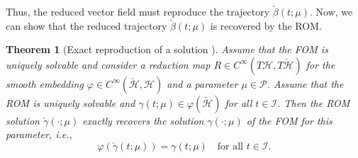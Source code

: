 \documentclass{article}
\theoremstyle{plain}
\newtheorem{theorem}{Theorem}[section]
\theoremstyle{definition}
\theoremstyle{remark}
\begin{document}
Thus, the reduced vector field must reproduce the trajectory \(\check{\beta}(t; \mu)\). Now, we can show that the reduced trajectory \(\check{\beta}(t; \mu)\) is recovered by the ROM.

\begin{theorem}[Exact reproduction of a solution \cite{buchfink2024}]
Assume that the FOM  is uniquely solvable and consider a reduction map $R \in C^{\infty}(T\mathcal{H}, T\check{\mathcal{H}})$ for the smooth embedding $\varphi \in C^{\infty}(\check{\mathcal{H}}, \mathcal{H})$ and a parameter $\mu \in \mathcal{P}$. Assume that the ROM is uniquely solvable and $\gamma(t; \mu) \in \varphi(\check{\mathcal{H}})$ for all $t \in \mathcal{I}$. Then the ROM solution $\check{\gamma}(\cdot; \mu)$ exactly recovers the solution $\gamma(\cdot; \mu)$ of the FOM  for this parameter, i.e.,
\begin{equation}
\varphi(\check{\gamma}(t; \mu)) = \gamma(t; \mu) \quad \text{for all } t \in \mathcal{I}.
\end{equation}
\end{theorem}
\end{document}
